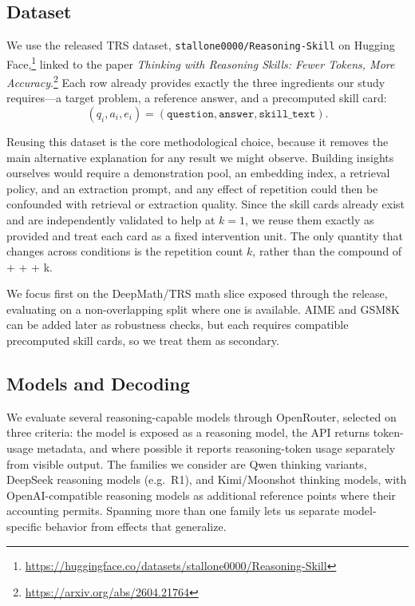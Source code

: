 \subsection{Dataset}
\label{sec:dataset}

We use the released TRS dataset, \texttt{stallone0000/Rea\-soning-Skill} on Hugging
Face,\footnote{\url{https://huggingface.co/datasets/stallone0000/Reasoning-Skill}}
linked to the paper \emph{Thinking with Reasoning Skills: Fewer Tokens, More
Accuracy}.\footnote{\url{https://arxiv.org/abs/2604.21764}} Each row already provides
exactly the three ingredients our study requires---a target problem, a reference
answer, and a precomputed skill card:
\[
    (q_i, a_i, e_i) = (\texttt{question}, \texttt{answer}, \texttt{skill\_text}).
\]

Reusing this dataset is the core methodological choice, because it removes the main
alternative explanation for any result we might observe. Building insights ourselves
would require a demonstration pool, an embedding index, a retrieval policy, and an
extraction prompt, and any effect of repetition could then be confounded with
retrieval or extraction quality. Since the skill cards already exist and are
independently validated to help at $k=1$, we reuse them exactly as provided and treat
each card as a fixed intervention unit. The only quantity that changes across
conditions is the repetition count $k$, rather than the compound of
 +  +  + k.

We focus first on the DeepMath/TRS math slice exposed through the release, evaluating
on a non-overlapping split where one is available. AIME and GSM8K can be added later
as robustness checks, but each requires compatible precomputed skill cards, so we
treat them as secondary.

\subsection{Models and Decoding}
\label{sec:model-selection}

We evaluate several reasoning-capable models through OpenRouter, selected on three
criteria: the model is exposed as a reasoning model, the API returns token-usage
metadata, and where possible it reports reasoning-token usage separately from visible
output. The families we consider are Qwen thinking variants, DeepSeek reasoning models
(e.g.\ R1), and Kimi/Moonshot thinking models, with OpenAI-compatible reasoning models
as additional reference points where their accounting permits. Spanning more than one
family lets us separate model-specific behavior from effects that generalize.

